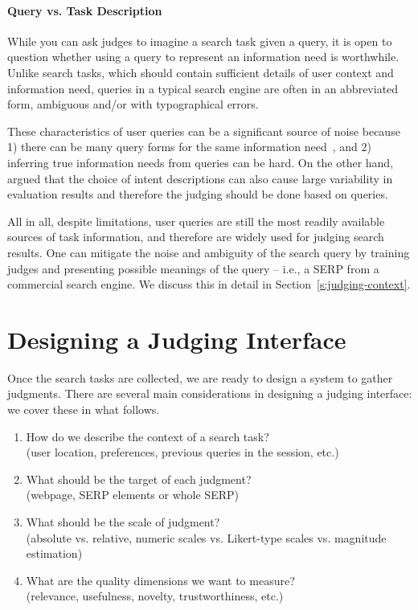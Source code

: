 
\paragraph{Query vs. Task Description} While you can ask judges to imagine a search task given a query, it is open to question whether using a query to represent an information need is worthwhile. Unlike search tasks, which should contain sufficient details of user context and information need, queries in a typical search engine are often in an abbreviated form, ambiguous and/or with typographical errors. 

These characteristics of user queries can be a significant source of noise because 1) there can be many query forms for the same information need~\citep{Bailey:2015:UVI}, and 2) inferring true information needs from queries can be hard. On the other hand, \cite{Yilmaz:2014:EID} argued that the choice of intent descriptions can also cause large variability in evaluation results and therefore the judging should be done based on queries.

All in all, despite limitations, user queries are still the most readily available sources of task information, and therefore are widely used for judging search results. One can mitigate the noise and ambiguity of the search query by training judges and presenting possible meanings of the query -- i.e., a SERP from a commercial search engine. We discuss this in detail in Section~\ref{s:judging-context}.

\section{Designing a Judging Interface}

Once the search tasks are collected, we are ready to design a system to gather judgments. There are several main considerations in designing a judging interface: we cover these in what follows.

\begin{enumerate}
	\item  How do we describe the context of a search task? \\(user location, preferences, previous queries in the session, etc.)
	\item  What should be the target of each judgment? \\(webpage, SERP elements or whole SERP)
	\item  What should be the scale of judgment? \\(absolute vs. relative, numeric scales vs. Likert-type scales vs. magnitude estimation)	
	\item  What are the quality dimensions we want to measure? \\(relevance, usefulness, novelty, trustworthiness, etc.)
\end{enumerate}

